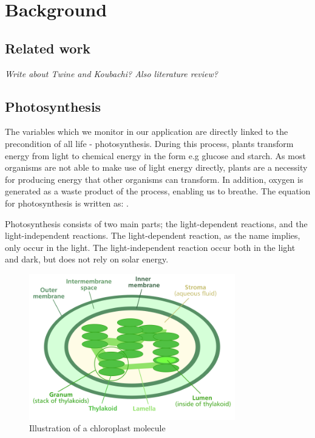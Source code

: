 \chapter{Background}

\section{Related work}
\emph{Write about Twine and Koubachi? Also literature review?}

\section{Photosynthesis}
The variables which we monitor in our application are directly linked to the precondition of all life - photosynthesis. During this process, plants  transform energy from light to chemical energy in the form e.g glucose and starch. As most organisms are not able to make use of light energy directly, plants are a necessity for producing energy that other organisms can transform. In addition, oxygen is generated as a waste product of the process, enabling us to breathe. The equation for photosynthesis is written as: . 

Photosynthesis consists of two main parts; the light-dependent reactions, and the light-independent reactions. The light-dependent reaction, as the name implies, only occur in the light. The light-independent reaction occur both in the light and dark, but does not rely on solar energy.  

\begin{figure}
\centering
\includegraphics[width=0.8\textwidth]{img/photosynthesis/Chloroplast_diagram.png}
\caption{Illustration of a chloroplast molecule \citep{wiki:chloroplast}}
\label{fig:chloroplast}
\end{figure}

